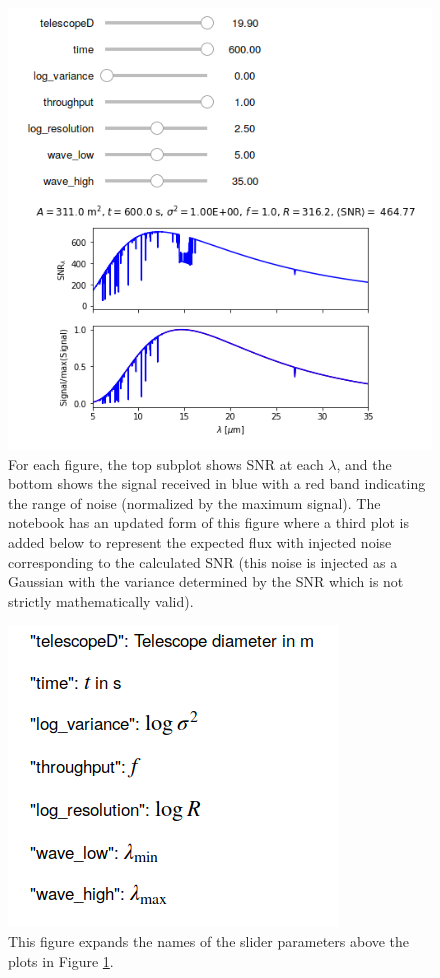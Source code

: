 \documentclass{knac}
\begin{document}
\begin{figure}
\begin{minipage}{0.33\textwidth}
    \end{minipage}
    \begin{minipage}{0.33\textwidth}
        \centering
        \includegraphics[width=1.0\linewidth]{widget_3.png}
    \end{minipage}
    \caption{For each figure, the top subplot shows SNR at each $\lambda$,
    and the bottom shows the signal received in blue with a red band indicating
    the range of noise (normalized by the maximum signal).
    The notebook has an updated form of this figure where a third plot is
    added below to represent the expected flux with injected noise
    corresponding to the calculated SNR (this noise is injected as a Gaussian
    with the variance determined by the SNR which is not strictly
    mathematically valid).}
    \label{figure:widget_all}
\end{figure}

\begin{figure}[h!]
\centering
\includegraphics[scale=0.6]{widget_slider.png}
\caption{This figure expands the names of the slider parameters above the plots in Figure \ref{figure:widget_all}.}
\label{figure:widget_slider}
\end{figure}
\end{document}

